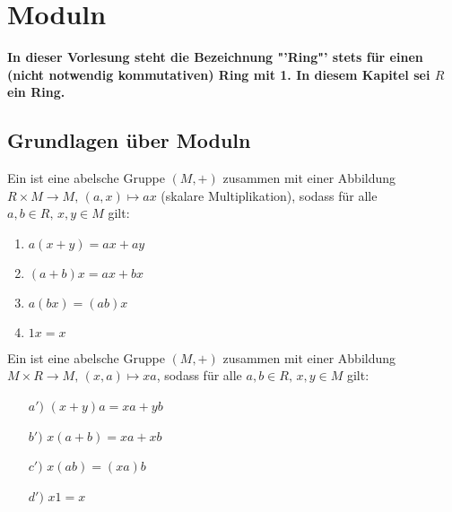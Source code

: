 \newpage
\section{Moduln}
\begin{center}
	\textbf{In dieser Vorlesung steht die Bezeichnung "'Ring"' stets für einen (nicht notwendig kommutativen) Ring mit 1. In diesem Kapitel sei $R$ ein Ring.}
\end{center}
\subsection{Grundlagen über Moduln}
\begin{df}\label{1.1}
	Ein  ist eine abelsche Gruppe $(M, +)$ zusammen mit einer Abbildung $R\times M \to M, \, (a,x) \mapsto ax$ (skalare Multiplikation), sodass für alle $a,b\in R, \, x,y\in M$ gilt:
	\begin{enumerate}[label= \alph*)]
		\item $a(x+y) = ax + ay$
		\item $(a+b)x = ax+bx$
		\item $a(bx) = (ab)x$
		\item $1x = x$
	\end{enumerate}
Ein  ist eine abelsche Gruppe $(M, +)$ zusammen mit einer Abbildung $M\times R \to M, \, (x,a) \mapsto xa$, sodass für alle $a,b\in R, \, x,y\in M$ gilt:
\begin{enumerate}
	\item[$a')$] $(x+y)a = xa+ yb$
	\item[$b')$] $x(a+b) = xa + xb$
	\item[$c')$] $x(ab) = (xa)b$
	\item[$d')$] $x1=x$
\end{enumerate}
\end{df}
